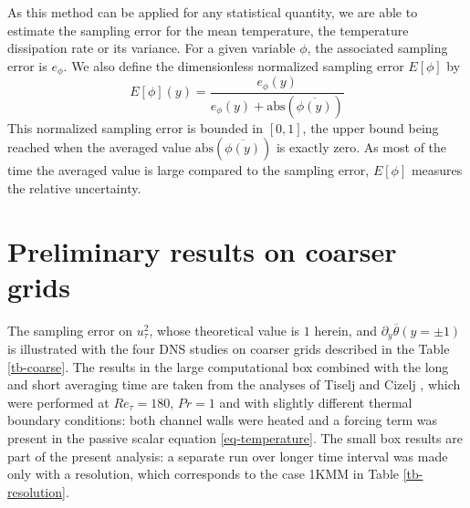 \documentclass[review]{elsarticle}
\begin{document}
As this method can be applied for any statistical quantity, we are able to estimate the sampling error for the mean temperature, the temperature dissipation rate or its variance. For a given variable $\phi$, the associated sampling error is $e_\phi$. We also define the dimensionless normalized sampling error $E\left[\phi\right]$ by
\begin{equation}
E\left[\phi\right]\left(y\right) = \frac{e_\phi \left(y\right)}{e_\phi \left(y\right) + \mbox{abs}\left( \overline{\phi \left(y\right)} \right)}
\end{equation}
This normalized sampling error is bounded in $[0,1]$, the upper bound being reached when the averaged value $\mbox{abs}\left( \overline{\phi \left(y\right)} \right)$ is exactly zero. As most of the time the averaged value is large compared to the sampling error, $E\left[\phi\right]$ measures the relative uncertainty.

\section{Preliminary results on coarser grids}

The sampling error on $u_\tau^2$, whose theoretical value is $1$ herein, and $\partial_y \overline{\theta} \left( y = \pm 1 \right)$ is illustrated with the four DNS studies on coarser grids described in the Table \ref{tb-coarse}. The results in the large computational box combined with the long and short averaging time are taken from the analyses of Tiselj and Cizelj \cite{tiselj2012dns}, which were performed at $Re_\tau=180$, $Pr=1$ and with slightly different thermal boundary conditions: both channel walls were heated and a forcing term was present in the passive scalar equation \eqref{eq-temperature}. The small box results are part of the present analysis: a separate run over longer time interval was made only with a resolution, which corresponds to the case 1KMM in Table \ref{tb-resolution}.
\end{document}
